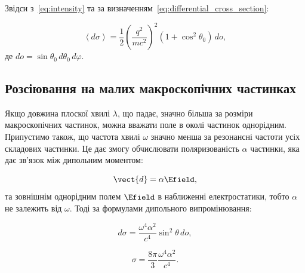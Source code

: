 Звідси з~\eqref{eq:intensity} та за визначенням~\eqref{eq:differential_cross_section}:

\begin{equation*}
\left\langle d\sigma \right\rangle = \frac{1}{2} \left( \frac{q^2}{mc^2} \right)^2 (1 + \cos^2 \theta_0) \, do,
\end{equation*}
%
де \( do = \sin \theta_0 \, d\theta_0 \, d\varphi \).


\subsection*{Розсіювання на малих макроскопічних частинках}

Якщо довжина плоскої хвилі \( \lambda \), що падає, значно більша за розміри макроскопічних частинок, можна вважати поле
в околі частинок однорідним. Припустимо також, що частота хвилі \( \omega \) значно менша за резонансні частоти усіх
складових частинки. Це дає змогу обчислювати поляризованість \( \alpha \) частинки, яка дає зв'язок між дипольним
моментом:

\begin{equation}
\vect{d} = \alpha \Efield,
\label{eq:polarizability}
\end{equation}
%
та зовнішнім однорідним полем \( \Efield \) в наближенні електростатики, тобто \( \alpha \) не залежить від \( \omega
\). Тоді за формулами дипольного випромінювання:

\begin{equation}
d\sigma = \frac{\omega^4 \alpha^2}{c^4} \sin^2 \theta \, do,
\label{eq:scattering_cross_section}
\end{equation}

\begin{equation}
\sigma = \frac{8\pi}{3} \frac{\omega^4 \alpha^2}{c^4}.
\label{eq:total_scattering_cross_section}
\end{equation}

